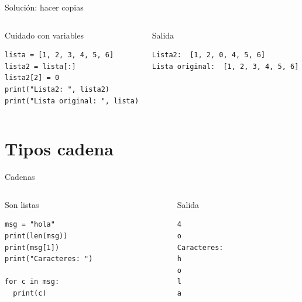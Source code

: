 \documentclass[bigger,unknownkeysallowed]{beamer}
\begin{document}
\begin{frame}[fragile,label={sec:org3769587}]{Solución: hacer copias}
 \begin{columns}[t]
\begin{column}{0.52\columnwidth}
\begin{exampleblock}{Cuidado con variables}
\begin{verbatim}
lista = [1, 2, 3, 4, 5, 6]
lista2 = lista[:]
lista2[2] = 0
print("Lista2: ", lista2)
print("Lista original: ", lista)
\end{verbatim}
\end{exampleblock}
\end{column}

\begin{column}{0.48\columnwidth}
\begin{block}{Salida}
\scriptsize
\begin{verbatim}
Lista2:  [1, 2, 0, 4, 5, 6]
Lista original:  [1, 2, 3, 4, 5, 6]
\end{verbatim}
\end{block}
\end{column}
\end{columns}
\end{frame}


\section{Tipos cadena}
\label{sec:org58b5851}

\begin{frame}[fragile,label={sec:orge5da442}]{Cadenas}
 \begin{columns}
\begin{column}{0.7\columnwidth}
\begin{block}{Son listas}
\begin{verbatim}
msg = "hola"
print(len(msg))
print(msg[1])
print("Caracteres: ")

for c in msg:
  print(c)
\end{verbatim}
\end{block}
\end{column}

\begin{column}{0.3\columnwidth}
\begin{block}{Salida}
\scriptsize
\begin{verbatim}
4
o
Caracteres: 
h
o
l
a
\end{verbatim}
\end{block}
\end{column}
\end{columns}
\end{frame}
\end{document}
